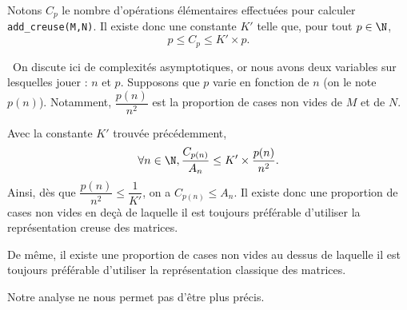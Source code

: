 Notons $C_p$ le nombre d'opérations élémentaires effectuées pour calculer \texttt{add_creuse(M,N)}. Il existe donc une constante $K'$ telle que, pour tout $p\in\N$, 
\begin{equation*}
  p \leq C_p \leq K'\times p.
\end{equation*}

\question\ 
On discute ici de complexités asymptotiques, or nous avons deux variables sur lesquelles jouer : $n$ et $p$. Supposons que $p$ varie en fonction de $n$ (on le note $p(n)$). 
Notamment, $\dfrac{p(n)}{n^2}$ est la proportion de cases non vides de $M$ et de $N$.

Avec la constante $K'$ trouvée précédemment,
\begin{equation*}
  \forall n \in \N, \dfrac{C_{p(n)}}{A_n} \leq K' \times \dfrac{p(n)}{n^2}.
\end{equation*}
Ainsi, dès que $\dfrac{p(n)}{n^2} \leq \dfrac{1}{K'}$, on a $C_{p(n)} \leq A_n$. 
Il existe donc une proportion de cases non vides en deçà de laquelle il est toujours préférable d'utiliser la représentation creuse des matrices.

De même, il existe une proportion de cases non vides au dessus de laquelle il est toujours préférable d'utiliser la représentation classique des matrices. 

Notre analyse ne nous permet pas d'être plus précis. 